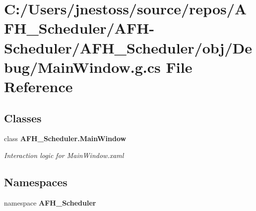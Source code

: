 \section{C\+:/\+Users/jnestoss/source/repos/\+A\+F\+H\+\_\+\+Scheduler/\+A\+F\+H-\/\+Scheduler/\+A\+F\+H\+\_\+\+Scheduler/obj/\+Debug/\+Main\+Window.g.\+cs File Reference}
\label{_debug_2_main_window_8g_8cs}
\subsection*{Classes}
\begin{DoxyCompactItemize}
\item 
class \textbf{ A\+F\+H\+\_\+\+Scheduler.\+Main\+Window}
\begin{DoxyCompactList}\small\item\em Interaction logic for Main\+Window.\+xaml \end{DoxyCompactList}\end{DoxyCompactItemize}
\subsection*{Namespaces}
\begin{DoxyCompactItemize}
\item 
namespace \textbf{ A\+F\+H\+\_\+\+Scheduler}
\end{DoxyCompactItemize}
